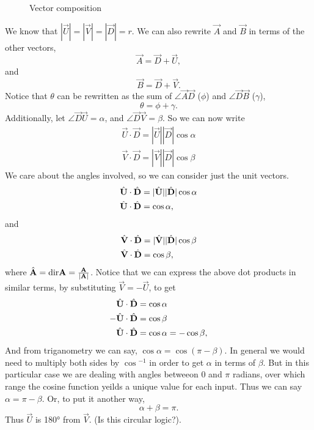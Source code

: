 \documentclass[main.tex]{subfiles}
\begin{document}
{\begin{figure}[h]
\begin{tikzpicture}
    \end{tikzpicture}
    \caption{Vector composition}
\end{figure}


We know that $|\vec{U}| = |\vec{V}| = |\vec{D}| = r$.
We can also rewrite $\vec{A}$ and $\vec{B}$ in terms of the other vectors,
\[\vec{A} = \vec{D} + \vec{U},\] and \[\vec{B} = \vec{D} + \vec{V}.\]
%
Notice that $\theta$ can be rewritten as the sum of 
$\angle{\vec{A}\vec{D}}$ ($\phi$) and $\angle{\vec{D}\vec{B}}$ ($\gamma$),
\[\theta = \phi + \gamma.\] Additionally, let $\angle{\vec{D}\vec{U}} = \alpha$,
and $\angle{\vec{D}\vec{V}} = \beta$. So we can now
write
%
\begin{align*}
\vec{U}\cdot\vec{D} = |\vec{U}||\vec{D}|\cos{\alpha}\\
\vec{V}\cdot\vec{D} = |\vec{V}||\vec{D}|\cos{\beta}
\end{align*}
%
We care about the angles involved, so we can consider just the unit vectors.
%
\begin{align*}
\dir{\vec{U}}\cdot\dir{\vec{D}} &= |\dir{\vec{U}}||\dir{\vec{D}}|\cos{\alpha}\\
\dir{\vec{U}}\cdot\dir{\vec{D}} &= \cos{\alpha},
\end{align*}
and
\begin{align*}
\dir{\vec{V}}\cdot\dir{\vec{D}} &= |\dir{\vec{V}}||\dir{\vec{D}}|\cos{\beta}\\
\dir{\vec{V}}\cdot\dir{\vec{D}} &= \cos{\beta},
\end{align*}
%
where $\dir{\vec{A}} = \text{dir}\vec{A} =\frac{\vec{A}}{|\vec{A}|}$. 
Notice that we can express the above dot products in similar terms,
by substituting $\vec{V} = -\vec{U}$, to get
%
\begin{align*}
\dir{\vec{U}}\cdot\dir{\vec{D}} &= \cos{\alpha}\\
-\dir{\vec{U}}\cdot\dir{\vec{D}} &= \cos{\beta}\\
\dir{\vec{U}}\cdot\dir{\vec{D}} &= \cos{\alpha} = -\cos{\beta},
\end{align*}
%
And from triganometry we can say, $\cos{\alpha} = \cos{(\pi-\beta)}$.
In general we would need to multiply both sides by $\cos{}^{-1}$ in order to get
$\alpha$ in terms of $\beta$. But in this particular case we are dealing with
angles betweeon $0$ and $\pi$ radians, over which range the cosine function 
yeilds a unique value for each input. Thus we can say $\alpha = \pi-\beta$.
Or, to put it another way,
\begin{equation} 
\alpha + \beta = \pi. \label{eq:1}
\end{equation}
 Thus $\vec{U}$ is \ang{180}
from $\vec{V}$. (Is this circular logic?).


}
\end{document}
